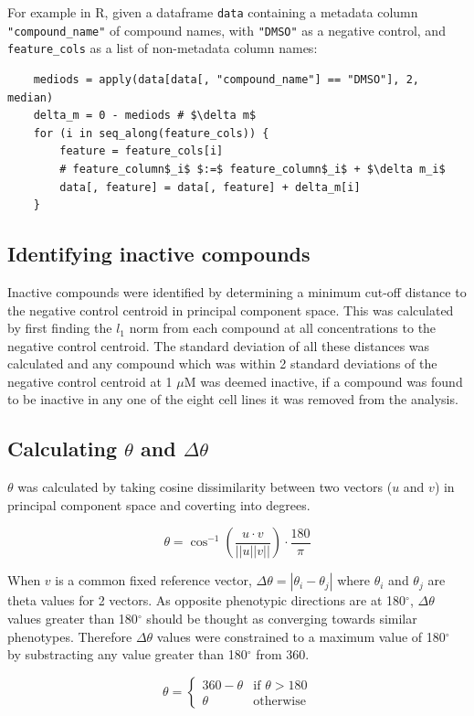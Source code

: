 \documentclass[a4paper,11pt,twoside,openright]{scrbook}
\begin{document}
For example in R, given a dataframe \texttt{data} containing a metadata column \texttt{"compound\_name"} of compound names, with \texttt{"DMSO"} as a negative control, and \texttt{feature\_cols} as a list of non-metadata column names:


\begin{verbatim}
    mediods = apply(data[data[, "compound_name"] == "DMSO"], 2, median)
    delta_m = 0 - mediods # $\delta m$
    for (i in seq_along(feature_cols)) {
        feature = feature_cols[i]
        # feature_column$_i$ $:=$ feature_column$_i$ + $\delta m_i$
        data[, feature] = data[, feature] + delta_m[i]
    }
\end{verbatim}


\subsection{Identifying inactive compounds}

Inactive compounds were identified by determining a minimum cut-off distance to the negative control centroid in principal component space.
This was calculated by first finding the $l_1$ norm from each compound at all concentrations to the negative control centroid.
The standard deviation of all these distances was calculated and any compound which was within 2 standard deviations of the negative control centroid at 1 $\mu$M was deemed inactive, if a compound was found to be inactive in any one of the eight cell lines it was removed from the analysis.


\subsection{Calculating $\theta$ and $\Delta\theta$}

$\theta$ was calculated by taking cosine dissimilarity between two vectors ($u$ and $v$) in principal component space and coverting into degrees.

\begin{equation} \label{equation:theta}
        \theta = \cos^{-1} \left( \frac{u \cdot v}{||u||v||} \right) \cdot \frac{180}{\pi}
\end{equation}

When $v$ is a common fixed reference vector, $\Delta\theta = |\theta_i - \theta_j|$ where $\theta_i$ and $\theta_j$ are theta values for 2 vectors.
As opposite phenotypic directions are at 180$^\circ$, $\Delta\theta$ values greater than 180$^\circ$ should be thought as converging towards similar phenotypes.
Therefore $\Delta\theta$ values were constrained to a maximum value of 180$^\circ$ by substracting any value greater than 180$^\circ$ from 360.

\begin{equation}
\theta = 
    \begin{cases}
        360 - \theta & \text{if } \theta > 180\\
        \theta       & \text{otherwise}
    \end{cases}
\end{equation}
\end{document}
